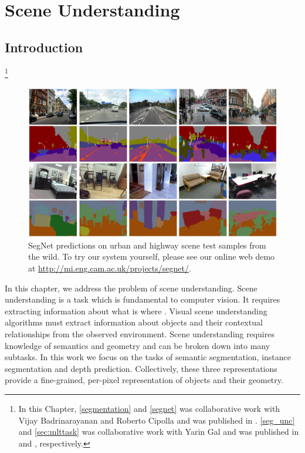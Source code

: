 

\chapter{Scene Understanding}
\label{scene_understanding}

\graphicspath{{Chapter2/Figs/}}

\section{Introduction}

{\let\thefootnote\relax\footnote{{In this Chapter, \cref{segmentation} and \cref{segnet} was collaborative work with Vijay Badrinarayanan and Roberto Cipolla and was published in \citep{badrinarayanan2017segnet}. \cref{seg_unc} and \cref{sec:mlttask} was collaborative work with Yarin Gal and was published in \citep{kendall2017uncertainties} and \citep{kendall2017multi}, respectively.}}}

\begin{figure}[t]
\center
\includegraphics[width=\textwidth]{segnet/CamVidTeaserwithIndoorScenes.jpg}
\caption[SegNet semantic segmentation predictions on indoor and outdoor scenes.]{SegNet predictions on urban and highway scene test samples from the wild. To try our system yourself, please see our online web demo at \url{http://mi.eng.cam.ac.uk/projects/segnet/}.}
\label{Teaser}
\end{figure}

In this chapter, we address the problem of scene understanding. Scene understanding is a task which is fundamental to computer vision. It requires extracting information about what is where \citep{marr1982vision}. Visual scene understanding algorithms must extract information about objects and their contextual relationships from the observed environment. Scene understanding requires knowledge of semantics and geometry and can be broken down into many subtasks. In this work we focus on the tasks of semantic segmentation, instance segmentation and depth prediction. Collectively, these three representations provide a fine-grained, per-pixel representation of objects and their geometry.

